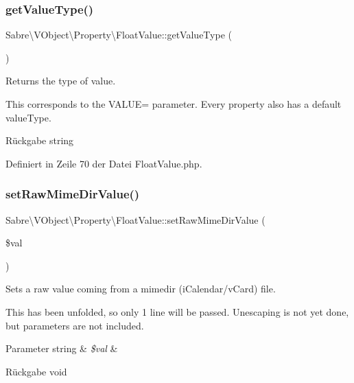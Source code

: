 \subsubsection{\texorpdfstring{get\+Value\+Type()}{getValueType()}}
{\footnotesize\ttfamily Sabre\textbackslash{}\+V\+Object\textbackslash{}\+Property\textbackslash{}\+Float\+Value\+::get\+Value\+Type (\begin{DoxyParamCaption}{ }\end{DoxyParamCaption})}

Returns the type of value.

This corresponds to the V\+A\+L\+UE= parameter. Every property also has a \textquotesingle{}default\textquotesingle{} value\+Type.

\begin{DoxyReturn}{Rückgabe}
string 
\end{DoxyReturn}


Definiert in Zeile 70 der Datei Float\+Value.\+php.

\mbox{\label{class_sabre_1_1_v_object_1_1_property_1_1_float_value_a286814db0ec9bcd65ea832402a583e65}} 
\subsubsection{\texorpdfstring{set\+Raw\+Mime\+Dir\+Value()}{setRawMimeDirValue()}}
{\footnotesize\ttfamily Sabre\textbackslash{}\+V\+Object\textbackslash{}\+Property\textbackslash{}\+Float\+Value\+::set\+Raw\+Mime\+Dir\+Value (\begin{DoxyParamCaption}\item[{}]{\$val }\end{DoxyParamCaption})}

Sets a raw value coming from a mimedir (i\+Calendar/v\+Card) file.

This has been \textquotesingle{}unfolded\textquotesingle{}, so only 1 line will be passed. Unescaping is not yet done, but parameters are not included.


\begin{DoxyParams}[1]{Parameter}
string & {\em \$val} & \\
\hline
\end{DoxyParams}
\begin{DoxyReturn}{Rückgabe}
void 
\end{DoxyReturn}


